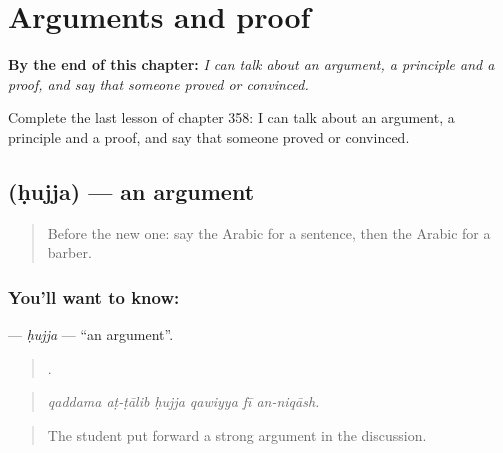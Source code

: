 
\chapter{Arguments and proof}
\label{ch:ar-arguments-and-proof}

\begin{chapteropening}
\textbf{By the end of this chapter:} \emph{I can talk about an argument, a principle and a proof, and say that someone proved or convinced.}

Complete the last lesson of chapter 358: I can talk about an argument, a principle and a proof, and say that someone proved or convinced.
\end{chapteropening}

\section[\texorpdfstring{\ar{حجة} (ḥujja)}{حجة (ḥujja)}]{ (ḥujja) — an argument}

\label{lesson:AR-C358-hujja}



\begin{quote}
Before the new one: say the Arabic for a sentence, then the Arabic for a barber.
\end{quote}

\subsection*{You'll want to know: }
\textbf{} — \emph{ḥujja} — \textquotedblleft{}an argument\textquotedblright{}.

\begin{quote}
     .
\end{quote}

\begin{quote}
\emph{qaddama aṭ-ṭālib ḥujja qawiyya fī an-niqāsh.}
\end{quote}

\begin{quote}
The student put forward a strong argument in the discussion.
\end{quote}

